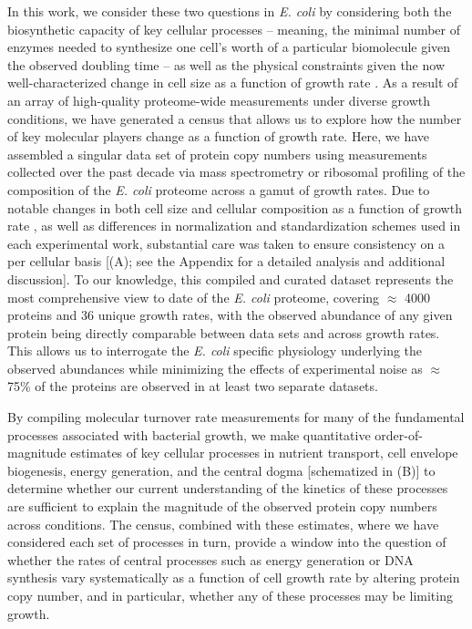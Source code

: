In this work, we consider these two questions in \textit{E. coli} by considering
both the biosynthetic capacity of key cellular processes --  meaning, the minimal
number of enzymes needed to synthesize one cell's worth of a particular biomolecule
given the observed doubling time --  as well as the physical constraints given the now
well-characterized change in cell size as a function of growth rate
\citep{taheriaraghi2015, si2017, basan2015}. As a result of an array of
high-quality proteome-wide measurements under diverse growth conditions, we have
generated a census that allows us to explore how the number of key molecular
players change as a function of growth rate. Here, we have assembled a singular
data set of protein copy numbers using measurements collected over the past
decade via mass spectrometry \citep{schmidt2016, peebo2015, valgepea2013} or
ribosomal profiling \citep{li2014} of the composition of the \textit{E. coli}
proteome across a gamut of growth rates. Due to notable changes in both cell
size and cellular composition as a function of growth rate \citep{bremer2008,
taheriaraghi2015}, as well as differences in normalization and standardization
schemes used in each experimental work, substantial care was taken to ensure
consistency on a per cellular basis [(A); see the Appendix for a detailed analysis
and additional discussion]. To our knowledge, this compiled and curated dataset
represents the most comprehensive view to date of the \textit{E. coli} proteome,
covering $\approx$ 4000 proteins and 36 unique growth rates, with the observed
abundance of any given protein being directly comparable between data sets and
across growth rates. This allows us to interrogate the \textit{E. coli} specific
physiology underlying the observed abundances while minimizing the effects of
experimental noise as $\approx$ 75\% of the  proteins are observed in at least
two separate datasets.

By compiling molecular turnover rate measurements for many of the
fundamental processes associated with bacterial growth, we make quantitative
order-of-magnitude estimates of key cellular processes in nutrient transport,
cell envelope biogenesis, energy generation, and the central dogma [schematized
in (B)] to determine whether our current understanding of the
kinetics of these processes are sufficient to explain the magnitude of the
observed protein copy numbers across conditions. The census, combined with these
estimates, where we have considered each set of processes in turn,
provide a window into the question of whether the rates of central
processes such as energy generation or DNA synthesis vary systematically as a
function of cell growth rate by altering protein copy number, and in particular,
whether any of these processes may be limiting growth.

